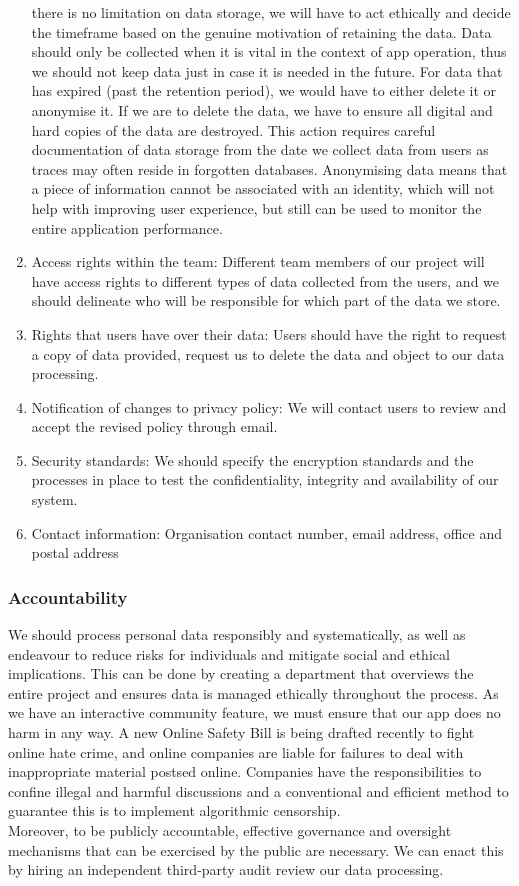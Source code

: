 \begin{enumerate}
    there is no limitation on data storage, we will have to act ethically and
    decide the timeframe based on the genuine motivation of retaining the data. Data should only be collected when it is vital in the context
    of app operation, thus we should not keep data just in case it is needed in the future. For data that has expired (past the retention period), we 
    would have to either delete it or anonymise it. If we are to delete the data, we have to ensure all digital and hard copies of the data are destroyed. 
    This action requires careful documentation of data storage from the date we collect data from users as traces may often reside in forgotten databases.
    Anonymising data means that a piece of information cannot be associated with an identity, which will not help with improving user experience, but still 
    can be used to monitor the entire application performance.
    \item Access rights within the team: Different team members of our project will have access rights to different types of data collected from
    the users, and we should delineate who will be responsible for which part of the data we store.
    \item Rights that users have over their data: Users should have the right to request a copy of data provided, request us to delete the data and object to our data processing.
    \item Notification of changes to privacy policy: We will contact users to review and accept the revised policy through email.
    \item Security standards: We should specify the encryption standards and the processes in place to test the confidentiality, integrity and availability of 
    our system.
    \item Contact information: Organisation contact number, email address, office and postal address
\end{enumerate}

\subsubsection{Accountability} 
We should process personal data responsibly and systematically, as well as endeavour to reduce risks for individuals and mitigate social and ethical implications.\cite{principles} 
This can be done by creating a department that overviews the entire project and ensures data is managed ethically throughout the process. As we have an interactive community 
feature, we must ensure that our app does no harm in any way. A new Online Safety Bill is being drafted recently to fight online hate crime, and online companies are liable for failures to
deal with inappropriate material postsed online.\cite{francis} \cite{parliamentlaw} Companies have the responsibilities to confine illegal and harmful discussions and a conventional and efficient method
to guarantee this is to implement algorithmic censorship. \\Moreover, to be publicly accountable, effective governance and oversight mechanisms that can be exercised by the public are necessary. 
We can enact this by hiring an independent third-party audit review our data processing.

